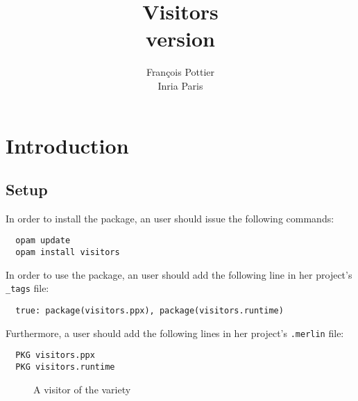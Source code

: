 \documentclass[11pt,a4paper,twoside]{article}
\title{Visitors\\\normalsize version \visitorsversion}
\date{}
\begin{document}
\author{François Pottier\\ Inria Paris\\ }
\maketitle


\clearpage
\tableofcontents
\clearpage


\section{Introduction}
\label{sec:intro}

\subsection{Setup}
\label{sec:intro:setup}

In order to install the \visitors package, an \opam user should issue the
following commands:
\begin{verbatim}
  opam update
  opam install visitors
\end{verbatim}
In order to use the \visitors package, an \ocamlbuild user should add the
following line in her project's \texttt{\_tags} file:
\begin{lstlisting}
  true: package(visitors.ppx), package(visitors.runtime)
\end{lstlisting}
Furthermore, a \merlin user should add the following lines in her project's
\texttt{.merlin} file:
\begin{lstlisting}
  PKG visitors.ppx
  PKG visitors.runtime
\end{lstlisting}


\begin{figure}[t]
\vspace{-\baselineskip}
\caption{A visitor of the \iter variety}
\label{fig:expr00}
\end{figure}
\end{document}
